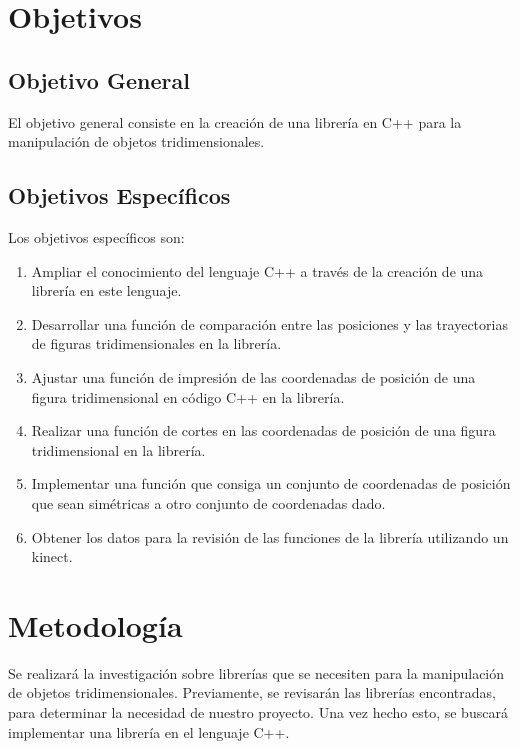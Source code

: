 \documentclass[letterpaper]{article}
\begin{document}
\section{Objetivos}

\subsection{Objetivo General}


El objetivo general consiste en la creación de una librería en C++ para la manipulación de objetos tridimensionales.\\


\subsection{Objetivos Específicos}

Los objetivos específicos son:\\

\begin{enumerate}
\item Ampliar el conocimiento del lenguaje C++ a través de la creación de una librería en este lenguaje. 
\item Desarrollar una función de comparación entre las posiciones y las trayectorias de figuras tridimensionales en la librería.
\item Ajustar una función de impresión de las coordenadas de posición de una figura tridimensional en código C++ en la librería. 
\item Realizar una función de cortes en las coordenadas de posición de una figura tridimensional en la librería.
\item Implementar una función que consiga un conjunto de coordenadas de posición que sean simétricas a otro conjunto de coordenadas dado.
\item Obtener los datos para la revisión de las funciones de la librería utilizando un kinect.
\end{enumerate}

\section{Metodología}


Se realizará la investigación sobre librerías que se necesiten para la manipulación de objetos tridimensionales. Previamente, se revisarán las 
librerías encontradas, para determinar la necesidad de nuestro proyecto. 
Una vez hecho esto, se buscará implementar una librería en el lenguaje C++.\\
\end{document}
